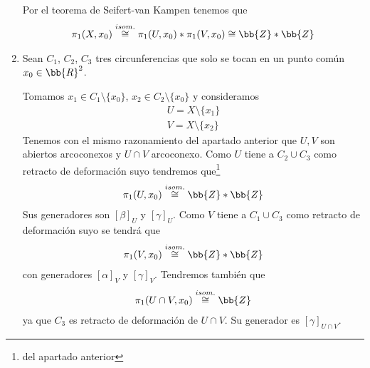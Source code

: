 \begin{ejemplo}
\begin{enumerate}
        Por el teorema de Seifert-van Kampen tenemos que 
        \begin{gather*}
            \pi_1(X,x_0) \overset{isom.}{\cong} \pi_1(U,x_0) \ast \pi_1(V,x_0) \cong \bb{Z} \ast \bb{Z}
        \end{gather*}


        \item Sean $C_1$, $C_2$, $C_3$ tres circunferencias que solo se tocan en un punto común $x_0\in \bb{R}^2$.
        
        \begin{figure}[H]
            \centering
        \end{figure}

        Tomamos $x_1\in C_1\setminus\{x_0\}$, $x_2\in C_2\setminus \{x_0\}$ y consideramos 
        \begin{gather*}
            U=X\setminus \{x_1\}\\
            V = X \setminus \{x_2\}
        \end{gather*}
        Tenemos con el mismo razonamiento del apartado anterior que $U,V$ son abiertos arcoconexos y $U\cap V$ arcoconexo. Como $U$ tiene a $C_2\cup C_3$ como retracto de deformación suyo tendremos que\footnote{del apartado anterior}
        \begin{gather*}
            \pi_1(U,x_0) \overset{isom.}{\cong} \bb{Z} \ast \bb{Z}
        \end{gather*}
        Sus generadores son $[\beta]_U$ y $[\gamma]_U$. Como $V$ tiene a $C_1\cup C_3$ como retracto de deformación suyo se tendrá que 
        \begin{gather*}
            \pi_1(V,x_0) \overset{isom.}{\cong} \bb{Z} \ast \bb{Z}
        \end{gather*}
        con generadores $[\alpha]_V$ y $[\gamma]_V$. Tendremos también que 
        \begin{gather*}
            \pi_1(U\cap V, x_0) \overset{isom.}{\cong} \bb{Z}
        \end{gather*}
        ya que $C_3$ es retracto de deformación de $U\cap V$. Su generador es $[\gamma]_{U\cap V}$.\\


\end{enumerate}
\end{ejemplo}
